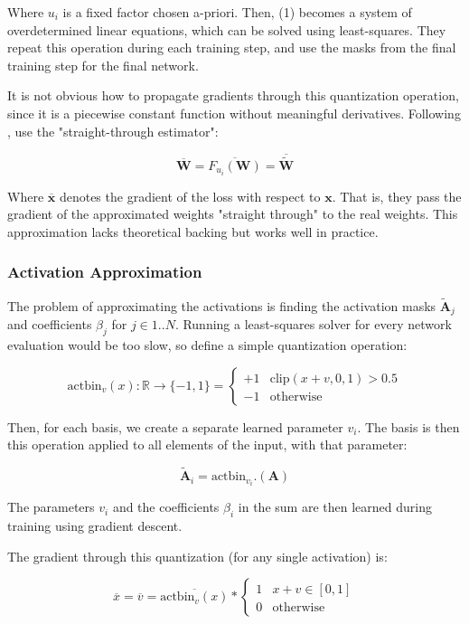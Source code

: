 \documentclass[12pt]{article}
\newcommand{\xv}[0]{\mathbf{x}}
\newcommand*{\Wv}[0]{\mathbf{W}}
\newcommand*{\Av}[0]{\mathbf{A}}
\newcommand*{\Wa}[0]{\widetilde{\mathbf{W}}}
\newcommand*{\Aa}[0]{\widetilde{\mathbf{A}}}
\newcommand*\lgrad[1]{\overline{#1}}
\begin{document}
Where \(u_i\) is a fixed factor chosen a-priori. Then, (1) becomes a system of overdetermined linear equations, which can be solved using least-squares. They repeat this operation
during each training step, and use the masks from the final training step for the final network.

It is not obvious how to propagate gradients through this quantization operation, since it is a piecewise constant function without meaningful derivatives.
Following \citet{BinarizedNeuralNetworks}, \citet{ABCNets} use the "straight-through estimator":

$$\overline{\Wv} = \overline{F_{u_i}(\Wv)} = \overline{\Wa}$$

Where \(\lgrad{\xv}\) denotes the gradient of the loss with respect to \(\xv\). That is, they pass the gradient of the approximated weights "straight through" to the real weights. This approximation lacks theoretical backing but works well in practice.

\subsubsection{Activation Approximation}
\label{sec:org5e8417e}
The problem of approximating the activations is finding the activation masks \(\Aa_j\) and coefficients \(\beta_j\) for \(j \in 1..N\). Running a least-squares solver for every network evaluation would be too slow, so \citet{ABCNets} define a simple quantization operation:

$$\mathrm{actbin}_v(x) : \mathbb{R} \to \{-1, 1\} = \begin{cases}
   +1 & \mathrm{clip}(x + v, 0, 1) > 0.5 \\
   -1 & \mathrm{otherwise}
\end{cases}$$

Then, for each basis, we create a separate learned parameter \(v_i\).
The basis is then this operation applied to all elements of the input, with that parameter:

$$\Aa_i = \mathrm{actbin}_{v_i}.(\Av)$$

The parameters \(v_i\) and the coefficients \(\beta_i\) in the sum are then learned during training using gradient descent.

The gradient through this quantization (for any single activation) is:

$$\lgrad{x} = \lgrad{v} = \lgrad{\mathrm{actbin}_v(x)} * \begin{cases}
1 & x + v \in [0, 1] \\
0 & \mathrm{otherwise}
\end{cases}$$
\end{document}
